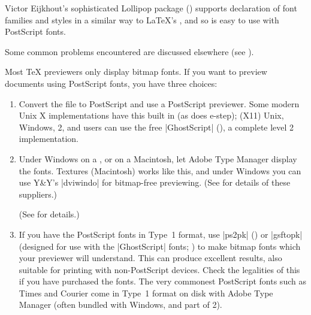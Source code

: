 Victor Eijkhout's sophisticated Lollipop package ()
supports declaration of font families and styles in a similar way to
\LaTeX{}'s , and so is easy to use with PostScript fonts.

Some common problems encountered are discussed elsewhere
(see ).


Most \TeX{} previewers only display bitmap  fonts. If you want to
preview documents using PostScript fonts, you have three choices:
\begin{enumerate}
\item Convert the  file to PostScript and use a
  PostScript previewer. Some modern Unix X implementations have this
  built in (as does e-step); (X11) Unix, Windows, 2, and \MSDOS{}
  users can use the free \ProgName|GhostScript| (), a
  complete level 2 implementation.
\item Under Windows on a , or on a Macintosh, let Adobe Type Manager
  display the fonts. Textures (Macintosh) works like this, and under
  Windows you can use Y\&Y's \ProgName|dviwindo| for bitmap-free
  previewing.
\htmlignore
  (See  for details of these
  suppliers.)
\endhtmlignore
\begin{htmlversion}
    (See  for details.)
\end{htmlversion}
\item If you have the PostScript fonts in Type~1 format,
  use \ProgName|ps2pk| () or \ProgName|gsftopk|
  (designed for use with the \ProgName|GhostScript| fonts;
  ) to make  bitmap fonts which your previewer
  will understand. This can produce excellent results, also suitable
  for printing with non-PostScript devices. Check the legalities of
  this if you have purchased the fonts. The very commonest PostScript
  fonts such as Times and Courier come in Type~1 format on disk with
  Adobe Type Manager (often bundled with Windows, and part of 2).
\end{enumerate}



